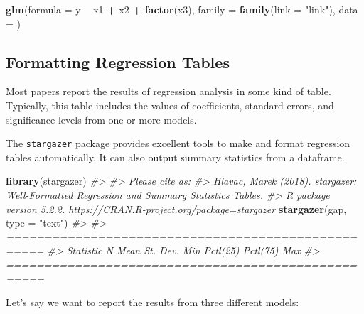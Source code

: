 \documentclass[]{book}
\newenvironment{Shaded}{\begin{snugshade}}{\end{snugshade}}
\newcommand{\KeywordTok}[1]{\textcolor[rgb]{0.13,0.29,0.53}{\textbf{#1}}}
\newcommand{\DataTypeTok}[1]{\textcolor[rgb]{0.13,0.29,0.53}{#1}}
\newcommand{\StringTok}[1]{\textcolor[rgb]{0.31,0.60,0.02}{#1}}
\newcommand{\CommentTok}[1]{\textcolor[rgb]{0.56,0.35,0.01}{\textit{#1}}}
\newcommand{\OperatorTok}[1]{\textcolor[rgb]{0.81,0.36,0.00}{\textbf{#1}}}
\newcommand{\NormalTok}[1]{#1}
\begin{document}
\begin{Shaded}
\begin{Highlighting}[]
\KeywordTok{glm}\NormalTok{(}\DataTypeTok{formula =}\NormalTok{ y }\OperatorTok{~}\StringTok{ }\NormalTok{x1 }\OperatorTok{+}\StringTok{ }\NormalTok{x2 }\OperatorTok{+}\StringTok{ }\KeywordTok{factor}\NormalTok{(x3), }\DataTypeTok{family =} \KeywordTok{family}\NormalTok{(}\DataTypeTok{link =} \StringTok{"link"}\NormalTok{),}
            \DataTypeTok{data =}\NormalTok{ )}
\end{Highlighting}
\end{Shaded}

\subsection{Formatting Regression
Tables}\label{formatting-regression-tables}

Most papers report the results of regression analysis in some kind of
table. Typically, this table includes the values of coefficients,
standard errors, and significance levels from one or more models.

The \texttt{stargazer} package provides excellent tools to make and
format regression tables automatically. It can also output summary
statistics from a dataframe.

\begin{Shaded}
\begin{Highlighting}[]
\KeywordTok{library}\NormalTok{(stargazer)}
\CommentTok{#> }
\CommentTok{#> Please cite as:}
\CommentTok{#>  Hlavac, Marek (2018). stargazer: Well-Formatted Regression and Summary Statistics Tables.}
\CommentTok{#>  R package version 5.2.2. https://CRAN.R-project.org/package=stargazer}
\KeywordTok{stargazer}\NormalTok{(gap, }\DataTypeTok{type =} \StringTok{"text"}\NormalTok{)}
\CommentTok{#> }
\CommentTok{#> ===================================================}
\CommentTok{#> Statistic N Mean St. Dev. Min Pctl(25) Pctl(75) Max}
\CommentTok{#> ===================================================}
\end{Highlighting}
\end{Shaded}

Let's say we want to report the results from three different models:
\end{document}
